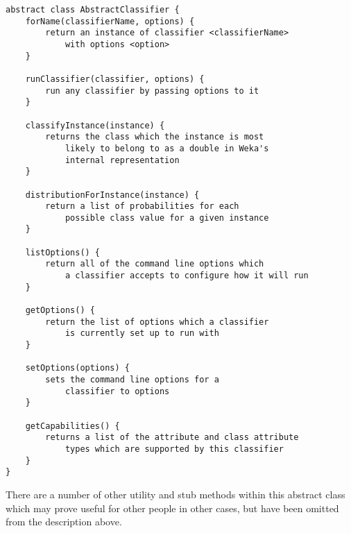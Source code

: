 \begin{footnotesize}
\begin{verbatim}
abstract class AbstractClassifier {
    forName(classifierName, options) {
        return an instance of classifier <classifierName>
            with options <option>
    }

    runClassifier(classifier, options) {
        run any classifier by passing options to it
    }

    classifyInstance(instance) {
        returns the class which the instance is most 
            likely to belong to as a double in Weka's
            internal representation
    }

    distributionForInstance(instance) {
        return a list of probabilities for each 
            possible class value for a given instance
    }

    listOptions() {
        return all of the command line options which 
            a classifier accepts to configure how it will run
    }

    getOptions() {
        return the list of options which a classifier
            is currently set up to run with
    }

    setOptions(options) {
        sets the command line options for a
            classifier to options
    }

    getCapabilities() {
        returns a list of the attribute and class attribute 
            types which are supported by this classifier
    }
}
\end{verbatim}
\end{footnotesize}

There are a number of other utility and stub methods within this abstract class which may prove useful for other people in other cases, but have been omitted from the description above.

